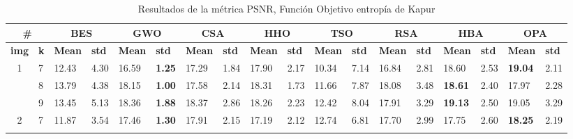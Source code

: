 \documentclass[conference]{IEEEtran}
\begin{document}
\begin{table}[]
	\caption{Resultados de la métrica PSNR, Función Objetivo entropía de Kapur}
	\begin{tabular}{|cl|ll|ll|ll|ll|ll|ll|ll|ll|}
		\hline
		\multicolumn{2}{|c|}{\textbf{\#}} & \multicolumn{2}{c|}{\textbf{BES}} & \multicolumn{2}{c|}{\textbf{GWO}} & \multicolumn{2}{c|}{\textbf{CSA}} & \multicolumn{2}{c|}{\textbf{HHO}} & \multicolumn{2}{c|}{\textbf{TSO}} & \multicolumn{2}{c|}{\textbf{RSA}} & \multicolumn{2}{c|}{\textbf{HBA}} & \multicolumn{2}{c|}{\textbf{OPA}} \\ \hline
		\multicolumn{1}{|l|}{\textbf{img}} & \textbf{k} & \multicolumn{1}{l|}{\textbf{Mean}} & \textbf{std} & \multicolumn{1}{l|}{\textbf{Mean}} & \textbf{std} & \multicolumn{1}{l|}{\textbf{Mean}} & \textbf{std} & \multicolumn{1}{l|}{\textbf{Mean}} & \textbf{std} & \multicolumn{1}{l|}{\textbf{Mean}} & \textbf{std} & \multicolumn{1}{l|}{\textbf{Mean}} & \textbf{std} & \multicolumn{1}{l|}{\textbf{Mean}} & \textbf{std} & \multicolumn{1}{l|}{\textbf{Mean}} & \textbf{std} \\ \hline
		\multicolumn{1}{|c|}{\multirow{3}{*}{1}} & 7 & \multicolumn{1}{l|}{12.43} & 4.30 & \multicolumn{1}{l|}{16.59} & \textbf{1.25} & \multicolumn{1}{l|}{17.29} & 1.84 & \multicolumn{1}{l|}{17.90} & 2.17 & \multicolumn{1}{l|}{10.34} & 7.14 & \multicolumn{1}{l|}{16.84} & 2.81 & \multicolumn{1}{l|}{18.60} & 2.53 & \multicolumn{1}{l|}{\textbf{19.04}} & 2.11 \\ \cline{2-18} 
		\multicolumn{1}{|c|}{} & 8 & \multicolumn{1}{l|}{13.79} & 4.38 & \multicolumn{1}{l|}{18.15} & \textbf{1.00} & \multicolumn{1}{l|}{17.58} & 2.14 & \multicolumn{1}{l|}{18.31} & 1.73 & \multicolumn{1}{l|}{11.66} & 7.87 & \multicolumn{1}{l|}{18.08} & 3.48 & \multicolumn{1}{l|}{\textbf{18.61}} & 2.40 & \multicolumn{1}{l|}{17.97} & 2.28 \\ \cline{2-18} 
		\multicolumn{1}{|c|}{} & 9 & \multicolumn{1}{l|}{13.45} & 5.13 & \multicolumn{1}{l|}{18.36} & \textbf{1.88} & \multicolumn{1}{l|}{18.37} & 2.86 & \multicolumn{1}{l|}{18.26} & 2.23 & \multicolumn{1}{l|}{12.42} & 8.04 & \multicolumn{1}{l|}{17.91} & 3.29 & \multicolumn{1}{l|}{\textbf{19.13}} & 2.50 & \multicolumn{1}{l|}{19.05} & 3.29 \\ \hline
		\multicolumn{1}{|c|}{\multirow{3}{*}{2}} & 7 & \multicolumn{1}{l|}{11.87} & 3.54 & \multicolumn{1}{l|}{17.46} & \textbf{1.30} & \multicolumn{1}{l|}{17.91} & 2.15 & \multicolumn{1}{l|}{17.19} & 2.12 & \multicolumn{1}{l|}{12.74} & 6.81 & \multicolumn{1}{l|}{17.70} & 2.99 & \multicolumn{1}{l|}{17.75} & 2.60 & \multicolumn{1}{l|}{\textbf{18.25}} & 2.19 \\ \cline{2-18} 

\end{tabular}
\end{table}
\end{document}
